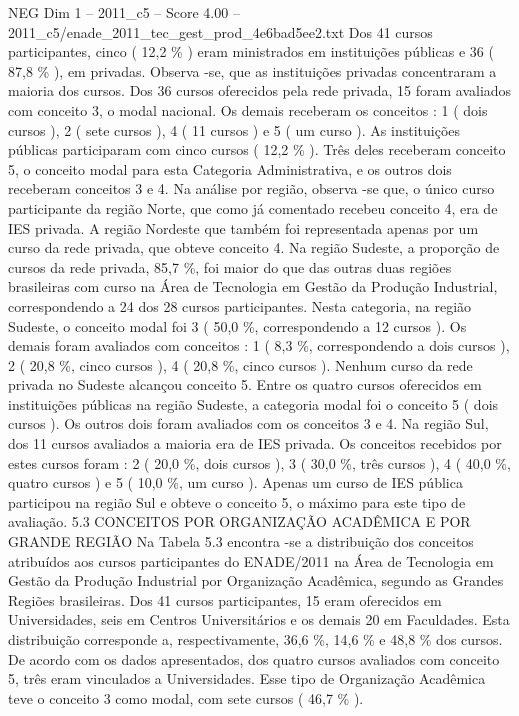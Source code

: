 \begin{textsample}{NEG Dim 1 – 2011\_c5 – Score 4.00 – 2011\_c5/enade\_2011\_tec\_gest\_prod\_4e6bad5ee2.txt}
Dos 41 cursos participantes, cinco ( 12,2 \% ) eram ministrados em instituições públicas e 36 ( 87,8 \% ), em privadas.
Observa -se, que as instituições privadas concentraram a maioria dos cursos.
Dos 36 cursos oferecidos pela rede privada, 15 foram avaliados com conceito 3, o modal nacional.
Os demais receberam os conceitos : 1 ( dois cursos ), 2 ( sete cursos ), 4 ( 11 cursos ) e 5 ( um curso ).
As instituições públicas participaram com cinco cursos ( 12,2 \% ).
Três deles receberam conceito 5, o conceito modal para esta Categoria Administrativa, e os outros dois receberam conceitos 3 e 4.
Na análise por região, observa -se que, o único curso participante da região Norte, que como já comentado recebeu conceito 4, era de IES privada.
A região Nordeste que também foi representada apenas por um curso da rede privada, que obteve conceito 4.
Na região Sudeste, a proporção de cursos da rede privada, 85,7 \%, foi maior do que das outras duas regiões brasileiras com curso na Área de Tecnologia em Gestão da Produção Industrial, correspondendo a 24 dos 28 cursos participantes.
Nesta categoria, na região Sudeste, o conceito modal foi 3 ( 50,0 \%, correspondendo a 12 cursos ).
Os demais foram avaliados com conceitos : 1 ( 8,3 \%, correspondendo a dois cursos ), 2 ( 20,8 \%, cinco cursos ), 4 ( 20,8 \%, cinco cursos ).
Nenhum curso da rede privada no Sudeste alcançou conceito 5.
Entre os quatro cursos oferecidos em instituições públicas na região Sudeste, a categoria modal foi o conceito 5 ( dois cursos ).
Os outros dois foram avaliados com os conceitos 3 e 4.
Na região Sul, dos 11 cursos avaliados a maioria era de IES privada.
Os conceitos recebidos por estes cursos foram : 2 ( 20,0 \%, dois cursos ), 3 ( 30,0 \%, três cursos ), 4 ( 40,0 \%, quatro cursos ) e 5 ( 10,0 \%, um curso ).
Apenas um curso de IES pública participou na região Sul e obteve o conceito 5, o máximo para este tipo de avaliação. 5.3 CONCEITOS POR ORGANIZAÇÃO ACADÊMICA E POR GRANDE REGIÃO Na Tabela 5.3 encontra -se a distribuição dos conceitos atribuídos aos cursos participantes do ENADE/2011 na Área de Tecnologia em Gestão da Produção Industrial por Organização Acadêmica, segundo as Grandes Regiões brasileiras.
Dos 41 cursos participantes, 15 eram oferecidos em Universidades, seis em Centros Universitários e os demais 20 em Faculdades.
Esta distribuição corresponde a, respectivamente, 36,6 \%, 14,6 \% e 48,8 \% dos cursos.
De acordo com os dados apresentados, dos quatro cursos avaliados com conceito 5, três eram vinculados a Universidades.
Esse tipo de Organização Acadêmica teve o conceito 3 como modal, com sete cursos ( 46,7 \% ).

\end{textsample}
